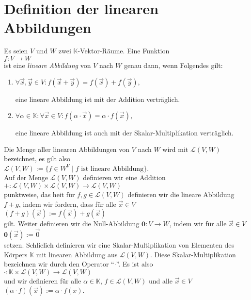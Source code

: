 \section{Definition der linearen Abbildungen}
\begin{Definition}[$\mathcal{L}(V, W)$]
Es seien $V$ und $W$ zwei $\mathbb{K}$-Vektor-R\"{a}ume.  Eine Funktion
\\[0.2cm]
\hspace*{1.3cm}
$f:V \rightarrow W$
\\[0.2cm]
ist eine \emph{lineare Abbildung} von $V$ nach $W$ genau dann, wenn Folgendes gilt:
\begin{enumerate}
\item $\forall \vec{x}, \vec{y} \in V: f(\vec{x} + \vec{y}) = f(\vec{x}) + f(\vec{y})$,

      eine lineare Abbildung ist mit der Addition vertr\"{a}glich.
\item $\forall \alpha \in \mathbb{K}: \forall \vec{x} \in V: f(\alpha \cdot \vec{x}) = \alpha \cdot f(\vec{x})$,

      eine lineare Abbildung ist auch mit der Skalar-Multiplikation vertr\"{a}glich.
\end{enumerate}
Die Menge aller linearen Abbildungen von $V$ nach $W$ wird mit $\mathcal{L}(V, W)$ bezeichnet, es
gilt also
\\[0.2cm]
\hspace*{1.3cm}
$\mathcal{L}(V, W) := \{ f \in W^V \mid \mbox{$f$ ist lineare Abbildung} \}$.
\\[0.2cm]
Auf der Menge $\mathcal{L}(V, W)$ definieren wir eine Addition
\\[0.2cm]
\hspace*{1.3cm}
$+: \mathcal{L}(V, W) \times \mathcal{L}(V, W) \rightarrow \mathcal{L}(V, W)$
\\[0.2cm]
punktweise, das hei\3t f\"{u}r $f,g \in \mathcal{L}(V, W)$ definieren wir die lineare Abbildung $f+g$,
indem wir fordern, dass f\"{u}r alle $\vec{x} \in V$
\\[0.2cm]
\hspace*{1.3cm}
$(f+g)(\vec{x}) := f(\vec{x}) + g(\vec{x})$ 
\\[0.2cm]
gilt.  Weiter definieren wir die Null-Abbildung $\mathbf{0}: V \rightarrow W$, indem wir f\"{u}r alle
$\vec{x} \in V$
\\[0.2cm]
\hspace*{1.3cm}
$\mathbf{0}(\vec{x}) := \vec{0}$
\\[0.2cm]
setzen.  Schlie\3lich definieren wir eine Skalar-Multiplikation von Elementen des K\"{o}rpers
$\mathbb{K}$ mit linearen Abbildung aus $\mathcal{L}(V,W)$.  Diese Skalar-Multiplikation bezeichnen
wir durch den Operator ``$\cdot$''.  Es ist also
\\[0.2cm]
\hspace*{1.3cm}
$\cdot: \mathbb{K} \times \mathcal{L}(V, W) \rightarrow \mathcal{L}(V, W)$
\\[0.2cm]
und wir definieren f\"{u}r alle $\alpha \in \mathbb{K}$, $f \in \mathcal{L}(V, W)$ und alle $\vec{x} \in V$
\\[0.2cm]
\hspace*{1.3cm}
$(\alpha \cdot f)(\vec{x}) := \alpha \cdot f(x)$.
 \eoxs
\end{Definition}

